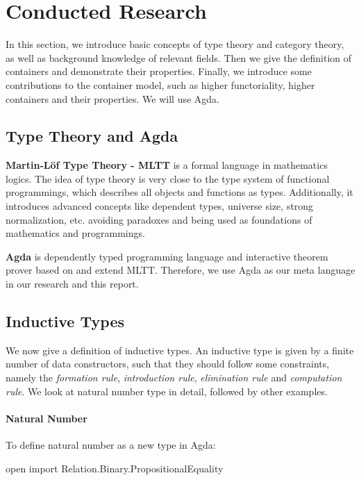 \chapter{Conducted Research}

In this section, we introduce basic concepts of type theory and category theory, as well as background knowledge of relevant fields. Then we give the definition of containers and demonstrate their properties. Finally, we introduce some contributions to the container model, such as higher functoriality, higher containers and their properties. We will use Agda.

\section{Type Theory and Agda}

\textbf{Martin-L\"of Type Theory - MLTT} is a formal language in mathematics logics. The idea of type theory is very close to the type system of functional programmings, which describes all objects and functions as types. Additionally, it introduces advanced concepts like dependent types, universe size, strong normalization, etc. avoiding paradoxes and being used as foundations of mathematics and programmings.

\textbf{Agda} is dependently typed programming language and interactive theorem prover based on and extend MLTT. Therefore, we use Agda as our meta language in our research and this report.

\section{Inductive Types}

We now give a definition of inductive types. An inductive type  is given by a finite number of data constructors, such that they should follow some constraints, namely the \textit{formation rule}, \textit{introduction rule}, \textit{elimination rule} and \textit{computation rule}. We look at natural number type in detail, followed by other examples.

\subsubsection*{Natural Number}

To define natural number  as a new type in Agda:

\begin{code}[hide]
open import Relation.Binary.PropositionalEquality
\end{code}

